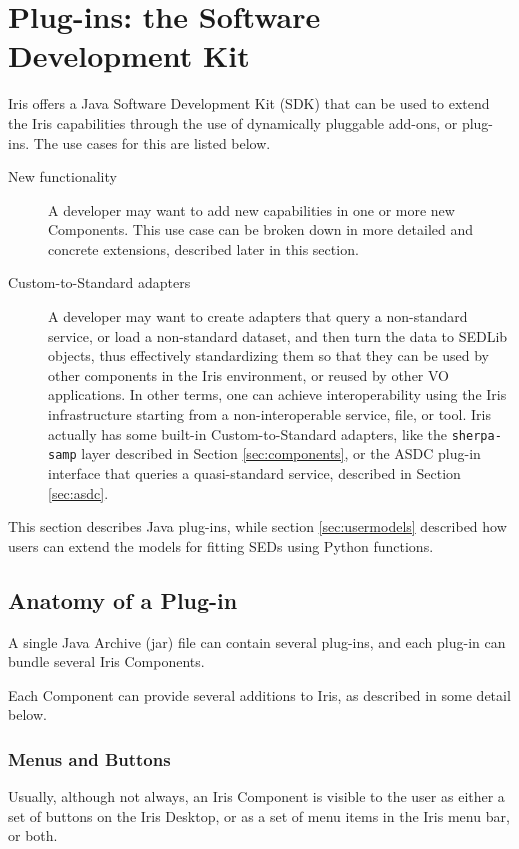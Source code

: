 \documentclass[preprint,authoryear,5p]{elsarticle}
\begin{document}
\section{Plug-ins: the Software Development Kit} \label{sec:plugins}

Iris offers a Java Software Development Kit (SDK) that can be used to extend the Iris
capabilities through the use of dynamically pluggable add-ons, or plug-ins.  The
use cases for this are listed below.
\begin{description} \item[New
functionality] A developer may want to add new capabilities in one or
more new Components. This use case can be broken down in more detailed and
concrete extensions, described later in this section.  \item[Custom-to-Standard
adapters] A developer may want to create adapters that query a non-standard
service, or load a non-standard dataset, and then turn the data to SEDLib
objects, thus effectively standardizing them so that they can be used by other
components in the Iris environment, or reused by other VO applications. In other
terms, one can achieve interoperability using the Iris infrastructure starting
from a non-interoperable service, file, or tool. Iris actually has some built-in
Custom-to-Standard adapters, like the \verb|sherpa-samp| layer described in Section
\ref{sec:components}, or the ASDC plug-in interface that queries a
quasi-standard service, described in Section \ref{sec:asdc}.  \end{description}

This section describes Java plug-ins, while section \ref{sec:usermodels} described how
users can extend the models for fitting SEDs using Python functions.

\subsection{Anatomy of a Plug-in} A single Java Archive (jar) file can contain several
plug-ins, and each plug-in can bundle several Iris Components.

Each Component can provide several additions to Iris, as described in some
detail below.

\subsubsection{Menus and Buttons} Usually, although not always, an Iris
Component is visible to the user as either a set of buttons on the Iris Desktop,
or as a set of menu items in the Iris menu bar, or both.
\end{document}
